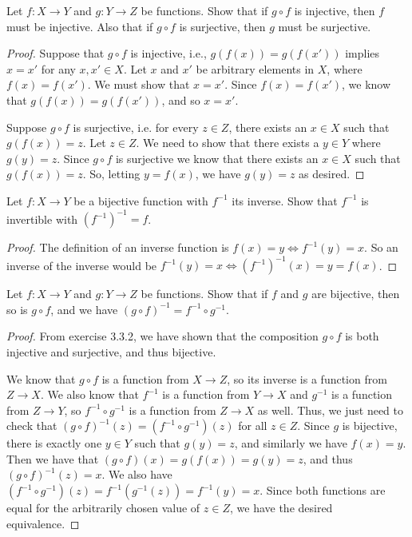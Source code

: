 \documentclass[12pt]{article}
\newenvironment{exercise}[2][Exercise]{\begin{trivlist}
\item[\hskip \labelsep {\bfseries #1}\hskip \labelsep {\bfseries #2}]}{\end{trivlist}}
\begin{document}
\begin{exercise}{3.3.5}
	Let $ f: X \to Y $ and $ g: Y \to Z $ be functions.
	Show that if $ g \circ f $ is injective, then $ f $ must be injective.
	Also that if $ g \circ f $ is surjective, then $ g $ must be surjective.
\end{exercise}
\begin{proof}
	Suppose that $ g \circ f $ is injective, i.e., $ g(f(x)) = g(f(x')) $ implies $ x = x' $ for any $ x, x' \in X $.
	Let $ x $ and $ x' $ be arbitrary elements in $ X $, where $ f(x) = f(x') $.
	We must show that $ x = x' $.
	Since $ f(x) = f(x') $, we know that $ g(f(x)) = g(f(x')) $, and so $ x = x' $.
	
	Suppose $ g \circ f $ is surjective, i.e. for every $ z \in Z $, there exists an $ x \in X $ such that $ g(f(x)) = z $.
	Let $ z \in Z $.
	We need to show that there exists a $ y \in Y $ where $ g(y) = z $.
	Since $ g \circ f $ is surjective we know that there exists an $ x \in X $ such that $ g(f(x)) = z $.
	So, letting $ y = f(x) $, we have $ g(y) = z $ as desired.
\end{proof}

\begin{exercise}{3.3.6}
	Let $ f: X \to Y $ be a bijective function with $ f^{-1} $ its inverse.
	Show that $ f^{-1} $ is invertible with $ (f^{-1})^{-1} = f $.
\end{exercise}
\begin{proof}
	The definition of an inverse function is $ f(x) = y \iff f^{-1}(y) = x $.
	So an inverse of the inverse would be $ f^{-1}(y) = x \iff (f^{-1})^{-1}(x) = y = f(x) $.
\end{proof}

\begin{exercise}{3.3.7}
	Let $ f : X \to Y $ and $ g : Y \to Z $ be functions.
	Show that if $ f $ and $ g $ are bijective, then so is $ g \circ f $, and we have $ (g \circ f)^{-1} = f^{-1} \circ g^{-1} $.
\end{exercise}
\begin{proof}
	From exercise 3.3.2, we have shown that the composition $ g \circ f $ is both injective and surjective, and thus bijective.
	
	We know that $ g \circ f $ is a function from $ X \to Z $, so its inverse is a function from $ Z \to X $.
	We also know that $ f^{-1} $ is a function from $ Y \to X $ and $ g^{-1} $ is a function from $ Z \to Y $, so $ f^{-1} \circ g^{-1} $ is a function from $ Z \to X $ as well.
	Thus, we just need to check that $ (g \circ f)^{-1}(z) = (f^{-1} \circ g^{-1})(z) $ for all $ z \in Z $.
	Since $ g $ is bijective, there is exactly one $ y \in Y $ such that $ g(y) = z $, and similarly we have $ f(x) = y $.
	Then we have that $ (g \circ f)(x) = g(f(x)) = g(y) = z $, and thus $ (g \circ f)^{-1}(z) = x $.
	We also have $ (f^{-1} \circ g^{-1})(z) = f^{-1}(g^{-1}(z)) = f^{-1}(y) = x $.
	Since both functions are equal for the arbitrarily chosen value of $ z \in Z $, we have the desired equivalence.
\end{proof}
\end{document}
